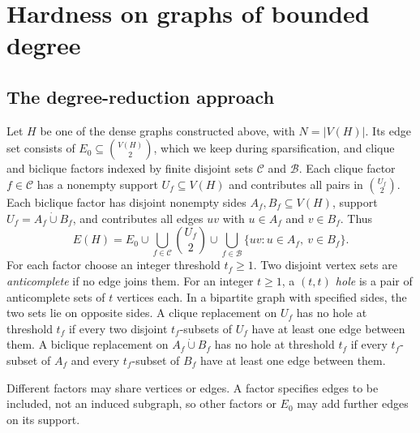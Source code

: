 \section{Hardness on graphs of bounded degree}
\label{sec:bounded-degree-hardness}

\subsection{The degree-reduction approach}

Let $H$ be one of the dense graphs constructed above, with
$N=|V(H)|$. Its edge set consists of $E_0\subseteq\binom{V(H)}2$,
which we keep during sparsification, and clique and biclique factors
indexed by finite disjoint sets $\mathcal C$ and $\mathcal B$.
Each clique factor $f\in\mathcal C$ has a nonempty support
$U_f\subseteq V(H)$ and contributes
all pairs in $\binom{U_f}{2}$. Each biclique factor has disjoint nonempty sides
$A_f,B_f\subseteq V(H)$, support $U_f=A_f\mathbin{\dot\cup}B_f$, and contributes
all edges $uv$ with $u\in A_f$ and $v\in B_f$. Thus
\begin{equation}\label{eq:factor-edge-union}
 E(H)=E_0\cup\bigcup_{f\in\mathcal C}\binom{U_f}{2}
       \cup\bigcup_{f\in\mathcal B}\{uv:u\in A_f,\ v\in B_f\}.
\end{equation}
For each factor choose an integer threshold $t_f\ge1$. Two
disjoint vertex sets are \emph{anticomplete} if no edge joins them.
For an integer $t\ge1$, a \emph{$(t,t)$ hole} is a pair of
anticomplete sets of $t$ vertices each. In a bipartite graph with specified sides, the two sets lie
on opposite sides. A clique replacement on $U_f$ has no hole at threshold $t_f$
if every two disjoint $t_f$-subsets of $U_f$ have at least one edge
between them. A biclique replacement on
$A_f\mathbin{\dot\cup}B_f$ has no hole at threshold $t_f$ if every
$t_f$-subset of $A_f$ and every $t_f$-subset of $B_f$ have at least
one edge between them.

Different factors may share vertices or edges. A factor specifies
edges to be included, not an induced subgraph, so other factors or
$E_0$ may add further edges on its support.

